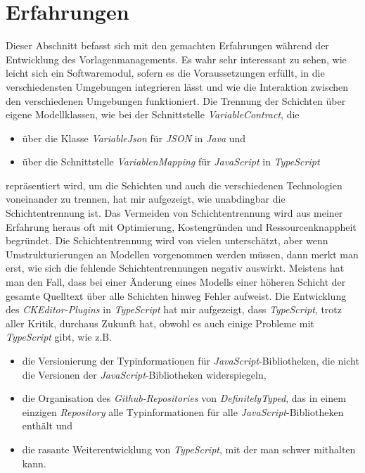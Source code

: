 \section{Erfahrungen}
Dieser Abschnitt befasst sich mit den gemachten Erfahrungen während der Entwicklung des Vorlagenmanagements.
\newline
\newline
Es wahr sehr interessant zu sehen, wie leicht sich ein Softwaremodul, sofern es die Voraussetzungen erfüllt, in die verschiedensten Umgebungen integrieren lässt und wie die Interaktion zwischen den verschiedenen Umgebungen funktioniert. Die Trennung der Schichten über eigene Modellklassen, wie bei der Schnittstelle \emph{VariableContract}, die 
\begin{itemize}
	\item über die Klasse \emph{VariableJson} für \emph{JSON} in \emph{Java} und
	\item über die Schnittstelle \emph{VariablenMapping} für \emph{JavaScript} in \emph{TypeScript}
\end{itemize}
repräsentiert wird, um die Schichten und auch die verschiedenen Technologien voneinander zu trennen, hat mir aufgezeigt, wie unabdingbar die Schichtentrennung ist. Das Vermeiden von Schichtentrennung wird aus meiner Erfahrung heraus oft mit 
Optimierung, Kostengründen und Ressourcenknappheit begründet. Die Schichtentrennung wird von vielen unterschätzt, aber wenn Umstrukturierungen an Modellen vorgenommen werden müssen, dann merkt man erst, wie sich die fehlende Schichtentrennungen negativ auswirkt. Meistens hat man den Fall, dass bei einer Änderung eines Modells einer höheren Schicht der gesamte Quelltext über alle Schichten hinweg Fehler aufweist.
\newline
\newline
Die Entwicklung des \emph{CKEditor-Plugins} in \emph{TypeScript} hat mir aufgezeigt, dass \emph{TypeScript}, trotz aller Kritik, durchaus Zukunft hat, obwohl es auch einige Probleme mit \emph{TypeScript} gibt, wie z.B.
\begin{itemize}
	\item die Versionierung der Typinformationen für \emph{JavaScript}-Bibliotheken, die nicht die Versionen der \emph{JavaScript}-Bibliotheken widerspiegeln,
	\item die Organisation des \emph{Github-Repositories} von \emph{DefinitelyTyped}, das in einem einzigen \emph{Repository} alle Typinformationen für alle \emph{JavaScript}-Bibliotheken enthält und
	\item die rasante Weiterentwicklung von \emph{TypeScript}, mit der man schwer mithalten kann.
\end{itemize}
